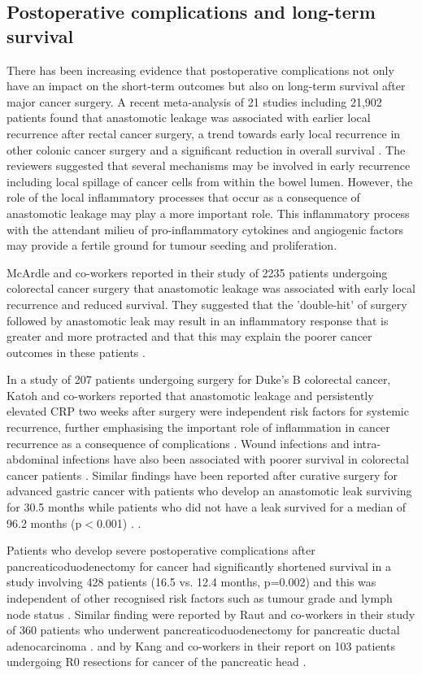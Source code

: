 \subsection{Postoperative complications and long-term survival}
There has been increasing evidence that postoperative complications not only have an impact on the short-term outcomes but also on long-term survival after major cancer surgery. 
A recent meta-analysis of 21 studies including 21,902 patients found that anastomotic leakage was associated with earlier local recurrence after rectal cancer surgery, a trend towards early local recurrence in other colonic cancer surgery and a significant reduction in overall survival \parencite{mirnezami_increased_2011}. 
The reviewers suggested that several mechanisms may be involved in early recurrence including local spillage of cancer cells from within the bowel lumen. 
However, the role of the local inflammatory processes that occur as a consequence of anastomotic leakage may play a more important role. 
This inflammatory process with the attendant milieu of pro-inflammatory cytokines and angiogenic factors may provide a fertile ground for tumour seeding and proliferation.

McArdle and co-workers reported in their study of 2235 patients undergoing colorectal cancer surgery that anastomotic leakage was associated with early local recurrence and reduced survival. 
They suggested that the 'double-hit' of surgery followed by anastomotic leak may result in an inflammatory response that is greater and more protracted and that this may explain the poorer cancer outcomes in these patients \parencite{mcardle_impact_2005}. 

In a study of 207 patients undergoing surgery for Duke's B colorectal cancer, Katoh and co-workers reported that anastomotic leakage and persistently elevated CRP two weeks after surgery were independent risk factors for systemic recurrence, further emphasising the important role of inflammation in cancer recurrence as a consequence of complications \parencite{katoh_anastomotic_2011}. 
Wound infections and intra-abdominal infections have also been associated with poorer survival in colorectal cancer patients \parencite{nespoli_impact_2006}. 
Similar findings have been reported after curative surgery for advanced gastric cancer with patients who develop an anastomotic leak surviving for 30.5 months while patients who did not have a leak survived for a median of 96.2 months (p$<$0.001) \parencite{yoo_negative_2011}. . 

Patients who develop severe postoperative complications after pancreaticoduodenectomy for cancer had significantly shortened survival in a study involving 428 patients (16.5 vs. 12.4 months, p=0.002) and this was independent of other recognised risk factors such as tumour grade and lymph node status \parencite{kamphues_postoperative_2012}. 
Similar finding were reported by Raut and co-workers in their study of 360 patients who underwent pancreaticoduodenectomy for pancreatic ductal adenocarcinoma \parencite{raut_impact_2007}. 
and by Kang and co-workers in their report on 103 patients undergoing R0 resections for cancer of the pancreatic head \parencite{kang_detrimental_2009}.

